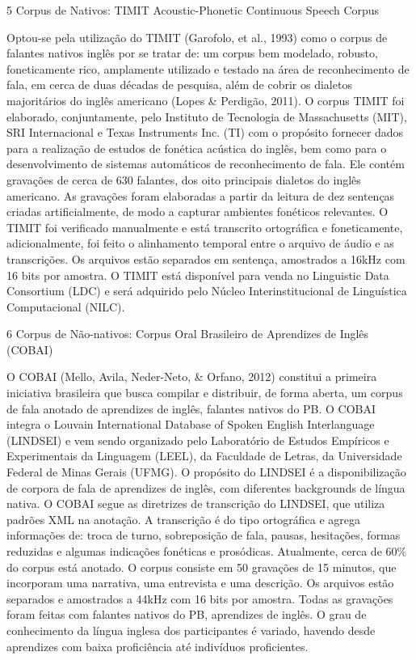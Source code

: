 5 Corpus de Nativos: TIMIT Acoustic-Phonetic Continuous Speech Corpus

Optou-se pela utiliza\c{c}\~ao do TIMIT (Garofolo, et al., 1993) como o corpus
de falantes nativos ingl\^es por se tratar de: um corpus bem modelado,
robusto, foneticamente rico, amplamente utilizado e testado na \'area de
reconhecimento de fala, em cerca de duas d\'ecadas de pesquisa, al\'em de
cobrir os dialetos majorit\'arios do ingl\^es americano (Lopes \& Perdig\~ao,
2011). O corpus TIMIT foi elaborado, conjuntamente, pelo Instituto de
Tecnologia de Massachusetts (MIT), SRI Internacional e Texas Instruments
Inc. (TI) com o prop\'osito fornecer dados para a realiza\c{c}\~ao de estudos de
fon\'etica ac\'ustica do ingl\^es, bem como para o desenvolvimento de sistemas
autom\'aticos de reconhecimento de fala. Ele cont\'em grava\c{c}\~oes de cerca de
630 falantes, dos oito principais dialetos do ingl\^es americano. As
grava\c{c}\~oes foram elaboradas a partir da leitura de dez senten\c{c}as criadas
artificialmente, de modo a capturar ambientes fon\'eticos relevantes. O
TIMIT foi verificado manualmente e est\'a transcrito ortogr\'afica e
foneticamente, adicionalmente, foi feito o alinhamento temporal entre o
arquivo de \'audio e as transcri\c{c}\~oes. Os arquivos est\~ao separados em
senten\c{c}a, amostrados a 16kHz com 16 bits por amostra. O TIMIT est\'a
dispon\'ivel para venda no Linguistic Data Consortium (LDC) e ser\'a
adquirido pelo N\'ucleo Interinstitucional de Lingu\'istica Computacional
(NILC).

6 Corpus de N\~ao-nativos: Corpus Oral Brasileiro de Aprendizes de Ingl\^es
(COBAI)

O COBAI (Mello, Avila, Neder-Neto, \& Orfano, 2012) constitui a primeira
iniciativa brasileira que busca compilar e distribuir, de forma aberta,
um corpus de fala anotado de aprendizes de ingl\^es, falantes nativos do
PB. O COBAI integra o Louvain International Database of Spoken English
Interlanguage (LINDSEI) e vem sendo organizado pelo Laborat\'orio de
Estudos Emp\'iricos e Experimentais da Linguagem (LEEL), da Faculdade de
Letras, da Universidade Federal de Minas Gerais (UFMG). O prop\'osito do
LINDSEI \'e a disponibiliza\c{c}\~ao de corpora de fala de aprendizes de ingl\^es,
com diferentes backgrounds de l\'ingua nativa. O COBAI segue as diretrizes
de transcri\c{c}\~ao do LINDSEI, que utiliza padr\~oes XML na anota\c{c}\~ao. A
transcri\c{c}\~ao \'e do tipo ortogr\'afica e agrega informa\c{c}\~oes de: troca de
turno, sobreposi\c{c}\~ao de fala, pausas, hesita\c{c}\~oes, formas reduzidas e
algumas indica\c{c}\~oes fon\'eticas e pros\'odicas. Atualmente, cerca de 60\% do
corpus est\'a anotado. O corpus consiste em 50 grava\c{c}\~oes de 15 minutos,
que incorporam uma narrativa, uma entrevista e uma descri\c{c}\~ao. Os
arquivos est\~ao separados e amostrados a 44kHz com 16 bits por amostra.
Todas as grava\c{c}\~oes foram feitas com falantes nativos do PB, aprendizes
de ingl\^es. O grau de conhecimento da l\'ingua inglesa dos participantes \'e
variado, havendo desde aprendizes com baixa profici\^encia at\'e indiv\'iduos
proficientes.

